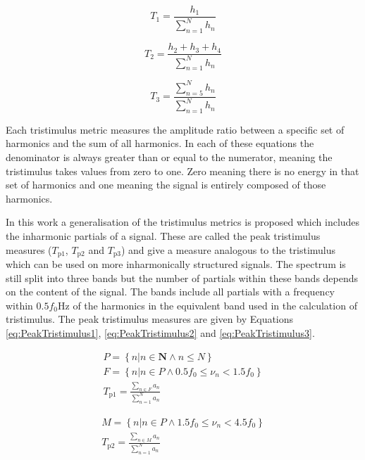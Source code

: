			\begin{equation}
				T_{1} = \frac{h_{1}}{\sum_{n = 1}^{N} h_{n}}
				\label{eq:Tristimulus1}
			\end{equation}

			\begin{equation}
				T_{2} = \frac{h_{2} + h_{3} + h_{4}}{\sum_{n = 1}^{N} h_{n}}
				\label{eq:Tristimulus2}
			\end{equation}

			\begin{equation}
				T_{3} = \frac{\sum_{n = 5}^{N} h_{n}}{\sum_{n = 1}^{N} h_{n}}
				\label{eq:Tristimulus3}
			\end{equation}

			Each tristimulus metric measures the amplitude ratio between a specific set of harmonics and the
			sum of all harmonics. In each of these equations the denominator is always greater than or equal to
			the numerator, meaning the tristimulus takes values from zero to one. Zero meaning there is no
			energy in that set of harmonics and one meaning the signal is entirely composed of those harmonics.

			In this work a generalisation of the tristimulus metrics is proposed which includes the inharmonic
			partials of a signal. These are called the peak tristimulus measures ($T_{\mathrm{p}1}$,
			$T_{\mathrm{p}2}$ and $T_{\mathrm{p}3}$) and give a measure analogous to the tristimulus which can
			be used on more inharmonically structured signals. The spectrum is still split into three bands but
			the number of partials within these bands depends on the content of the signal. The bands include
			all partials with a frequency within $0.5f_{0}$Hz of the harmonics in the equivalent band used in
			the calculation of tristimulus.  The peak tristimulus measures are given by Equations
			\ref{eq:PeakTristimulus1}, \ref{eq:PeakTristimulus2} and \ref{eq:PeakTristimulus3}.

			\begin{gather}
				P = \left\{ n | n \in \textbf{N} \land n \leq N \right\} \nonumber \\
				F = \left\{ n | n \in P \land 0.5f_{0} \leq \nu_{n} < 1.5f_{0} \right\} \nonumber \\
				T_{\mathrm{p}1} = \frac{\sum_{n \in F} a_{n}}{\sum_{n = 1}^{N} a_{n}}
				\label{eq:PeakTristimulus1}
			\end{gather}

			\begin{gather}
				M = \left\{ n | n \in P \land 1.5f_{0} \leq \nu_{n} < 4.5f_{0} \right\} \nonumber \\
				T_{\mathrm{p}2} = \frac{\sum_{n \in M} a_{n}}{\sum_{n = 1}^{N} a_{n}}
				\label{eq:PeakTristimulus2}
			\end{gather}

